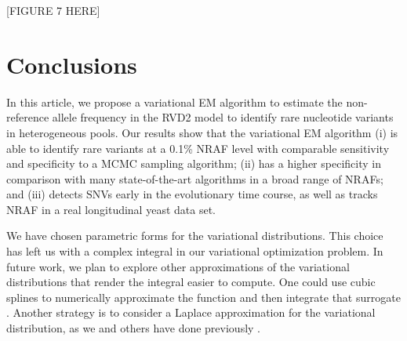 \documentclass{bmcart}
\begin{document}
\vspace{2em}
\begin{center}
[FIGURE 7 HERE]  
\end{center}
\vspace{2em}



\section{Conclusions}
In this article, we propose a variational EM algorithm to estimate the non-reference allele frequency in the RVD2 model to identify rare nucleotide variants in heterogeneous pools.
Our results show that the variational EM algorithm
(i) is able to identify rare variants at a 0.1\% NRAF level with comparable sensitivity and specificity to a MCMC sampling algorithm;
(ii) has a higher specificity in comparison with many state-of-the-art algorithms in a broad range of NRAFs;
and (iii) detects SNVs early in the evolutionary time course, as well as tracks NRAF in a real longitudinal yeast data set.

We have chosen parametric forms for the variational distributions.
This choice has left us with a complex integral in our variational optimization problem.
In future work, we plan to explore other approximations of the variational distributions that render the integral easier to compute.
One could use cubic splines to numerically approximate the function and then integrate that surrogate \cite{de1978practical}.
Another strategy is to consider a Laplace approximation for the variational distribution, as we and others have done previously \cite{saddiki2014glad, wang2013variational}.

\end{document}
